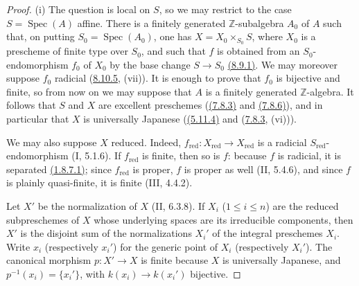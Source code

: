 \begin{proof}
\textup{(i)} The question is local on $S$, so we may restrict to the
case $S=\operatorname{Spec}(A)$ affine.  There is a finitely generated
$\mathbb Z$-subalgebra $A_0$ of $A$ such that, on putting
$S_0=\operatorname{Spec}(A_0)$, one has
$X=X_0\times_{S_0}S$, where $X_0$ is a prescheme of finite type over
$S_0$, and such that $f$ is obtained from an $S_0$-endomorphism $f_0$
of $X_0$ by the base change $S\to S_0$ {\hyperref[IV.8.9.1]{(8.9.1)}}.  We may moreover
suppose $f_0$ radicial ({\hyperref[IV.8.10.5]{8.10.5}}, (vii)).  It is enough to prove that
$f_0$ is bijective and finite, so from now on we may suppose that $A$
is a finitely generated $\mathbb Z$-algebra.  It follows that $S$ and
$X$ are excellent preschemes ({\hyperref[IV.7.8.3]{(7.8.3)}} and {\hyperref[IV.7.8.6]{(7.8.6)}}), and in particular
that $X$ is universally Japanese ({\hyperref[IV.5.11.4]{(5.11.4)}} and ({\hyperref[IV.7.8.3]{7.8.3}}, (vi))).

We may also suppose $X$ reduced.  Indeed,
$f_{\mathrm{red}}:X_{\mathrm{red}}\to X_{\mathrm{red}}$ is a radicial
$S_{\mathrm{red}}$-endomorphism (I, 5.1.6).  If
$f_{\mathrm{red}}$ is finite, then so is $f$: because $f$ is radicial,
it is separated {\hyperref[IV.1.8.7]{(1.8.7.1)}}; since $f_{\mathrm{red}}$ is proper, $f$ is
proper as well (II, 5.4.6), and since $f$ is plainly quasi-finite, it is
finite (III, 4.4.2).

Let $X'$ be the normalization of $X$ (II, 6.3.8).  If
$X_i$ ($1\leq i\leq n$) are the reduced subpreschemes of $X$ whose
underlying spaces are its irreducible components, then $X'$ is the
disjoint sum of the normalizations $X_i'$ of the integral preschemes
$X_i$.  Write $x_i$ (respectively $x_i'$) for the generic point of
$X_i$ (respectively $X_i'$).  The canonical morphism $p:X'\to X$ is
finite because $X$ is universally Japanese, and
$p^{-1}(x_i)=\{x_i'\}$, with $k(x_i)\to k(x_i')$ bijective.


\end{proof}
